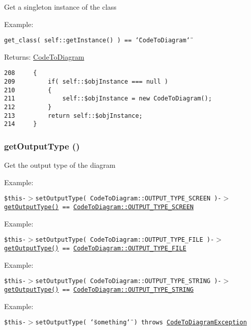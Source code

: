Get a singleton instance of the class

\begin{Desc}
\item[Example:]\end{Desc}
{\tt  get\_\-class( self::getInstance() ) == \char`\"{}CodeToDiagram\char`\"{} }

\begin{Desc}
\item[Returns:]\hyperlink{class_code_to_diagram}{CodeToDiagram} \end{Desc}


\begin{Code}\begin{verbatim}208     {
209         if( self::$objInstance === null )
210         {
211             self::$objInstance = new CodeToDiagram();
212         }
213         return self::$objInstance;
214     }
\end{verbatim}
\end{Code}


\hypertarget{class_code_to_diagram_04fb2bc09c8adb24bf9c585bb4dee691}{
\subsubsection[{getOutputType}]{\setlength{\rightskip}{0pt plus 5cm}getOutputType ()}}
\label{class_code_to_diagram_04fb2bc09c8adb24bf9c585bb4dee691}


Get the output type of the diagram

\begin{Desc}
\item[Example:]\end{Desc}
{\tt  \$this-$>$setOutputType( CodeToDiagram::OUTPUT\_\-TYPE\_\-SCREEN )-$>$\hyperlink{class_code_to_diagram_04fb2bc09c8adb24bf9c585bb4dee691}{getOutputType()} == \hyperlink{class_code_to_diagram_746cadd14bdda9d3c0ae3c4433bc2478}{CodeToDiagram::OUTPUT\_\-TYPE\_\-SCREEN} } \begin{Desc}
\item[Example:]\end{Desc}
{\tt  \$this-$>$setOutputType( CodeToDiagram::OUTPUT\_\-TYPE\_\-FILE )-$>$\hyperlink{class_code_to_diagram_04fb2bc09c8adb24bf9c585bb4dee691}{getOutputType()} == \hyperlink{class_code_to_diagram_6432f4d95031e2666449bb92c20f7d7e}{CodeToDiagram::OUTPUT\_\-TYPE\_\-FILE} } \begin{Desc}
\item[Example:]\end{Desc}
{\tt  \$this-$>$setOutputType( CodeToDiagram::OUTPUT\_\-TYPE\_\-STRING )-$>$\hyperlink{class_code_to_diagram_04fb2bc09c8adb24bf9c585bb4dee691}{getOutputType()} == \hyperlink{class_code_to_diagram_7b2a676828728d3c85df18eebb42854f}{CodeToDiagram::OUTPUT\_\-TYPE\_\-STRING} } \begin{Desc}
\item[Example:]\end{Desc}
{\tt  \$this-$>$setOutputType( \char`\"{}something\char`\"{} ) throws \hyperlink{class_code_to_diagram_exception}{CodeToDiagramException} }

